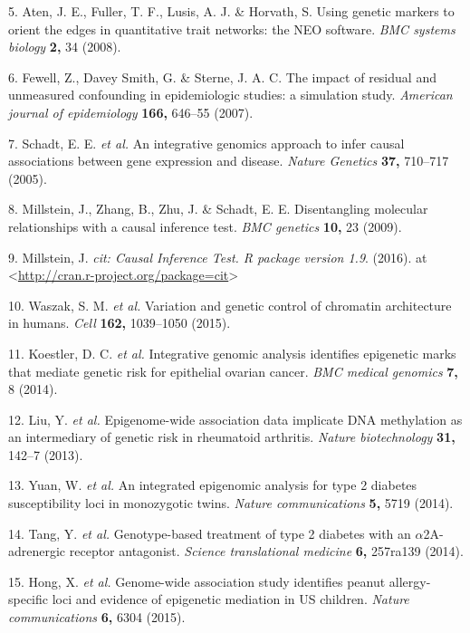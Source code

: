 \documentclass[]{article}
\begin{document}
\hypertarget{ref-Aten2008}{}
5. Aten, J. E., Fuller, T. F., Lusis, A. J. \& Horvath, S. Using genetic
markers to orient the edges in quantitative trait networks: the NEO
software. \emph{BMC systems biology} \textbf{2,} 34 (2008).

\hypertarget{ref-Fewell2007}{}
6. Fewell, Z., Davey Smith, G. \& Sterne, J. A. C. The impact of
residual and unmeasured confounding in epidemiologic studies: a
simulation study. \emph{American journal of epidemiology} \textbf{166,}
646--55 (2007).

\hypertarget{ref-Schadt2005}{}
7. Schadt, E. E. \emph{et al.} An integrative genomics approach to infer
causal associations between gene expression and disease. \emph{Nature
Genetics} \textbf{37,} 710--717 (2005).

\hypertarget{ref-Millstein2009}{}
8. Millstein, J., Zhang, B., Zhu, J. \& Schadt, E. E. Disentangling
molecular relationships with a causal inference test. \emph{BMC
genetics} \textbf{10,} 23 (2009).

\hypertarget{ref-Millstein2016}{}
9. Millstein, J. \emph{cit: Causal Inference Test. R package version
1.9}. (2016). at
\textless{}\url{http://cran.r-project.org/package=cit}\textgreater{}

\hypertarget{ref-Waszak2015}{}
10. Waszak, S. M. \emph{et al.} Variation and genetic control of
chromatin architecture in humans. \emph{Cell} \textbf{162,} 1039--1050
(2015).

\hypertarget{ref-Koestler2014}{}
11. Koestler, D. C. \emph{et al.} Integrative genomic analysis
identifies epigenetic marks that mediate genetic risk for epithelial
ovarian cancer. \emph{BMC medical genomics} \textbf{7,} 8 (2014).

\hypertarget{ref-Liu2013}{}
12. Liu, Y. \emph{et al.} Epigenome-wide association data implicate DNA
methylation as an intermediary of genetic risk in rheumatoid arthritis.
\emph{Nature biotechnology} \textbf{31,} 142--7 (2013).

\hypertarget{ref-Yuan2014}{}
13. Yuan, W. \emph{et al.} An integrated epigenomic analysis for type 2
diabetes susceptibility loci in monozygotic twins. \emph{Nature
communications} \textbf{5,} 5719 (2014).

\hypertarget{ref-Tang2014}{}
14. Tang, Y. \emph{et al.} Genotype-based treatment of type 2 diabetes
with an \(\alpha\)2A-adrenergic receptor antagonist. \emph{Science
translational medicine} \textbf{6,} 257ra139 (2014).

\hypertarget{ref-Hong2015}{}
15. Hong, X. \emph{et al.} Genome-wide association study identifies
peanut allergy-specific loci and evidence of epigenetic mediation in US
children. \emph{Nature communications} \textbf{6,} 6304 (2015).
\end{document}
